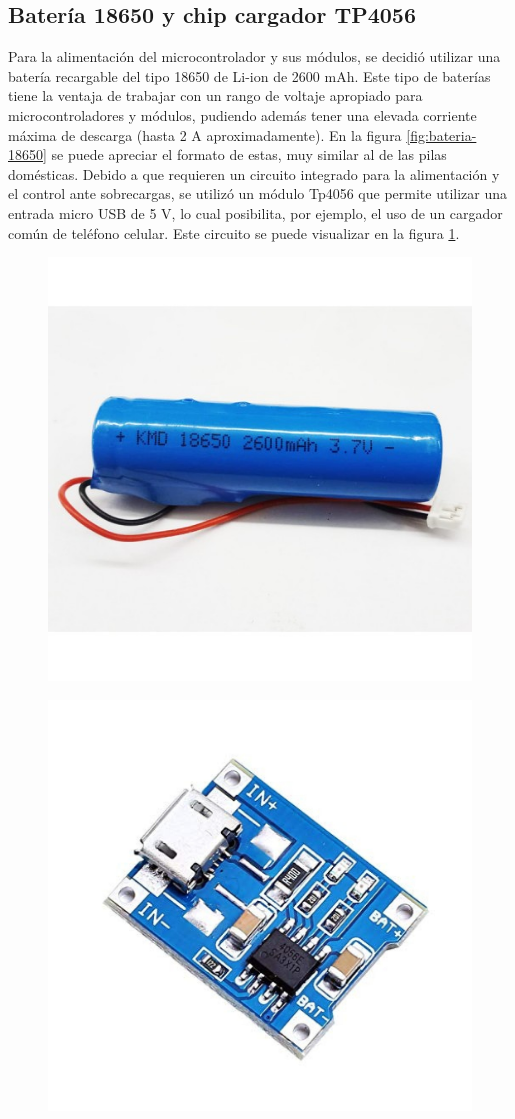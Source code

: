 \subsection{Batería 18650 y chip cargador TP4056}

Para la alimentación del microcontrolador y sus módulos, se decidió utilizar una batería recargable del tipo 18650 de Li-ion de 2600 mAh. Este tipo de baterías tiene la ventaja de trabajar con un rango de voltaje apropiado para microcontroladores y módulos, pudiendo además tener una elevada corriente máxima de descarga (hasta 2 A aproximadamente). En la figura \ref{fig:bateria-18650} se puede apreciar el formato de estas, muy similar al de las pilas domésticas. Debido a que requieren un circuito integrado para la alimentación y el control ante sobrecargas, se utilizó un módulo Tp4056 que permite utilizar una entrada micro USB de 5 V, lo cual posibilita, por ejemplo, el uso de un cargador común de teléfono celular. Este circuito se puede visualizar en la figura \ref{fig:circuito-mp4056}.

\begin{figure}[H]
\centering
\begin{minipage}{.5\textwidth}
  \centering
  \includegraphics[width=.4\linewidth]{./Figures/18650.jpg}
  \label{fig:bateria-18650}
\end{minipage}%
\begin{minipage}{.5\textwidth}
  \centering
  \includegraphics[width=.4\linewidth]{./Figures/tp4056.jpg}
  \label{fig:circuito-mp4056}
\end{minipage}
\end{figure}

